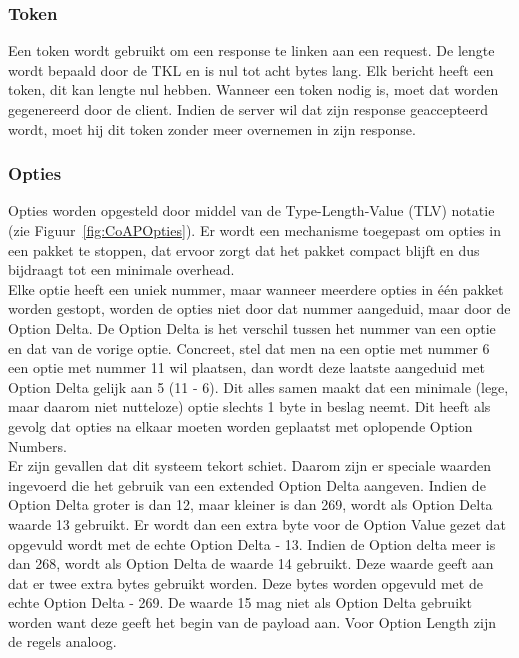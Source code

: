 \subsubsection{Token}

Een token wordt gebruikt om een response te linken aan een request. De lengte wordt bepaald door de TKL en is nul tot acht bytes lang. Elk bericht heeft een token, dit kan lengte nul hebben. Wanneer een token nodig is, moet dat worden gegenereerd door de client. Indien de server wil dat zijn response geaccepteerd wordt, moet hij dit token zonder meer overnemen in zijn response.

\newpage

\subsubsection{Opties}

Opties worden opgesteld door middel van de Type-Length-Value (TLV) notatie (zie Figuur~\ref{fig:CoAPOpties}). Er wordt een mechanisme toegepast om opties in een pakket te stoppen, dat ervoor zorgt dat het pakket compact blijft en dus bijdraagt tot een minimale overhead.\\

Elke optie heeft een uniek nummer, maar wanneer meerdere opties in \'{e}\'{e}n pakket worden gestopt, worden de opties niet door dat nummer aangeduid, maar door de Option Delta. De Option Delta is het verschil tussen het nummer van een optie en dat van de vorige optie.
Concreet, stel dat men na een optie met nummer 6 een optie met nummer 11 wil plaatsen, dan wordt deze laatste aangeduid met Option Delta gelijk aan 5 (11 - 6). Dit alles samen maakt dat een minimale (lege, maar daarom niet nutteloze) optie slechts 1 byte in beslag neemt. Dit heeft als gevolg dat opties na elkaar moeten worden geplaatst met oplopende Option Numbers.\\

Er zijn gevallen dat dit systeem tekort schiet. Daarom zijn er speciale waarden ingevoerd die het gebruik van een extended Option Delta aangeven. Indien de Option Delta groter is dan 12, maar kleiner is dan 269, wordt als Option Delta waarde 13 gebruikt. Er wordt dan een extra byte voor de Option Value gezet dat opgevuld wordt met de echte Option Delta - 13. Indien de Option delta meer is dan 268, wordt als Option Delta de waarde 14 gebruikt. Deze waarde geeft aan dat er twee extra bytes gebruikt worden. Deze bytes worden opgevuld met de echte Option Delta - 269. De waarde 15 mag niet als Option Delta gebruikt worden want deze geeft het begin van de payload aan. Voor Option Length zijn de regels analoog.


